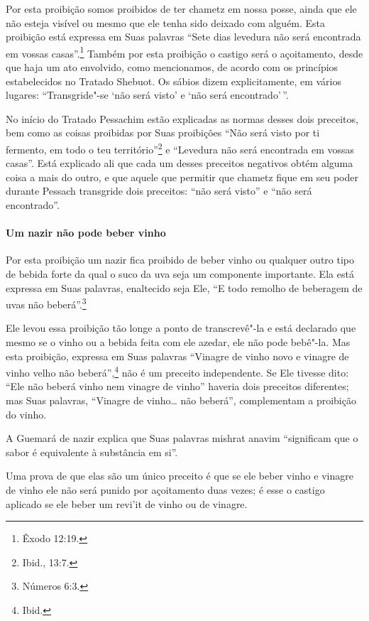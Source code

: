 \begin{multicols}{2}
Por esta proibição somos proibidos de ter chametz\starr{} em nossa posse,
ainda que ele não esteja visível ou mesmo que ele tenha sido deixado com
alguém. Esta proibição está expressa em Suas palavras ``Sete dias
levedura não será encontrada em vossas casas''.\footnote{Êxodo 12:19.} Também por
esta proibição o castigo será o açoitamento, desde que haja um ato
envolvido, como mencionamos, de acordo com os princípios estabelecidos
no Tratado Shebuot\starr. Os sábios dizem explicitamente, em vários lugares:
``Transgride"-se `não será visto' e `não será encontrado'\,''.

No início do Tratado Pessachim\starr{} estão explicadas as normas desses dois
preceitos, bem como as coisas proibidas por Suas proibições ``Não será
visto por ti fermento, em todo o teu território''\footnote{Ibid., 13:7.} e
``Levedura não será encontrada em vossas casas''. Está explicado ali que
cada um desses preceitos negativos obtém alguma coisa a mais do outro, e
que aquele que permitir que chametz\starr{} fique em seu poder durante
Pessach\starr{} transgride dois preceitos: ``não será visto'' e ``não será
encontrado''.

\paragraph{Um nazir\starr{} não pode beber vinho}

Por esta proibição um nazir\starr{} fica proibido de beber vinho ou qualquer
outro tipo de bebida forte da qual o suco da uva seja um componente
importante. Ela está expressa em Suas palavras, enaltecido seja Ele, ``E
todo remolho de beberagem de uvas não beberá''.\footnote{Números 6:3.}

Ele levou essa proibição tão longe a ponto de transcrevê"-la e está
declarado que mesmo se o vinho ou a bebida feita com ele azedar, ele não
pode bebê"-la. Mas esta proibição, expressa em Suas palavras ``Vinagre
de vinho novo e vinagre de vinho velho não beberá'',\footnote{Ibid.} não é um
preceito independente. Se Ele tivesse dito: ``Ele não beberá vinho nem
vinagre de vinho'' haveria dois preceitos diferentes; mas Suas
palavras, ``Vinagre de vinho\ldots{} não beberá'', complementam a proibição
do vinho.

A Guemará\starr{} de nazir\starr{} explica que Suas palavras mishrat anavim\starr{}
``significam que o sabor é equivalente à substância em si''.

Uma prova de que elas são um único preceito é que se ele beber vinho e
vinagre de vinho ele não será punido por açoitamento duas vezes; é esse
o castigo aplicado se ele beber um revi'it\starr{} de
vinho ou de vinagre.


\end{multicols}
